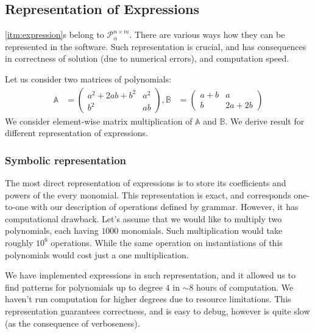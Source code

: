 \subsection{Representation of Expressions}
\ref{itm:expression}s belong to $\mathcal{P}^{n \times m}_\alpha$. There are various
ways how they can be represented in the software. Such representation is crucial, and has consequences in
correctness of solution (due to numerical errors), and computation speed.

Let us consider two matrices of polynomials:
\begin{align*}
\mathbb{A} &= \begin{pmatrix} a^2 + 2ab + b^2 & a^2\\ b^2 & ab \end{pmatrix}, \mathbb{B} &= \begin{pmatrix} a + b & a\\ b & 2a + 2b \end{pmatrix}
\end{align*}
We consider element-wise matrix multiplication of $\mathbb{A}$ and $\mathbb{B}$. We derive result for different representation of expressions.



\subsubsection{Symbolic representation}
The most direct representation of expressions is to store its coefficients and powers of the every monomial.
This representation is exact, and corresponds one-to-one with our description of operations
defined by grammar. However, it has computational drawback. 
Let's assume that we would like to multiply two polynomials, each having $1000$ monomials.
Such multiplication would take roughly $10^6$ operations. While the same operation on instantiations of
this polynomials would cost just a one multiplication.


We have implemented expressions in such representation, and it allowed us
to find patterns for polynomials up to degree $4$ in $\sim 8$ hours of computation. We haven't run computation for 
higher degrees due to resource limitations. This representation guarantees correctness, and is easy to debug, however
is quite slow (as the consequence of verboseness). 

